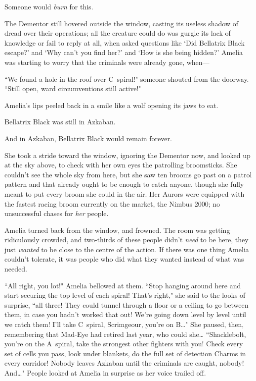 Someone would \emph{burn} for this.

The Dementor still hovered outside the window, casting its useless shadow of dread over their operations; all the creature could do was gurgle its lack of knowledge or fail to reply at all, when asked questions like `Did Bellatrix Black escape?' and `Why can't you find her?' and `How is she being hidden?' Amelia was starting to worry that the criminals were already gone, when—

``We found a hole in the roof over C~spiral!" someone shouted from the doorway. ``Still open, ward circumventions still active!"

Amelia's lips peeled back in a smile like a wolf opening its jaws to eat.

Bellatrix Black was still in Azkaban.

And in Azkaban, Bellatrix Black would remain forever.

She took a stride toward the window, ignoring the Dementor now, and looked up at the sky above, to check with her own eyes the patrolling broomsticks. She couldn't see the whole sky from here, but she saw ten brooms go past on a patrol pattern and that already ought to be enough to catch anyone, though she fully meant to put every broom she could in the air. Her Aurors were equipped with the fastest racing broom currently on the market, the Nimbus 2000; no unsuccessful chases for \emph{her} people.

Amelia turned back from the window, and frowned. The room was getting ridiculously crowded, and two-thirds of these people didn't \emph{need} to be here, they just \emph{wanted} to be close to the centre of the action. If there was one thing Amelia couldn't tolerate, it was people who did what they wanted instead of what was needed.

``All right, you lot!" Amelia bellowed at them. ``Stop hanging around here and start securing the top level of each spiral! That's right," she said to the looks of surprise, ``all three! They could tunnel through a floor or a ceiling to go between them, in case you hadn't worked that out! We're going down level by level until we catch them! I'll take C~spiral, Scrimgeour, you're on B{\ldots}" She paused, then, remembering that Mad-Eye had retired last year, who could she{\ldots} ``Shacklebolt, you're on the A~spiral, take the strongest other fighters with you! Check every set of cells you pass, look under blankets, do the full set of detection Charms in every corridor! Nobody leaves Azkaban until the criminals are caught, nobody! And{\ldots}" People looked at Amelia in surprise as her voice trailed off.

